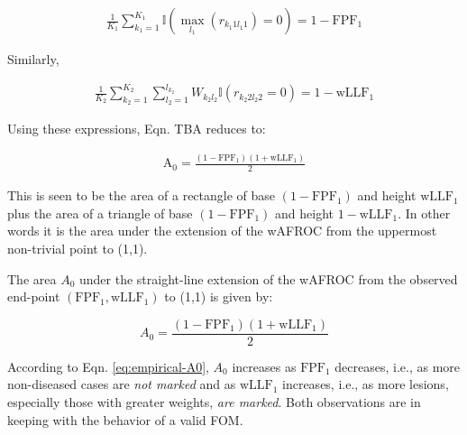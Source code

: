 \documentclass[
]{book}
\begin{document}
\begin{equation}
\begin{aligned}
\frac{1}{K_1}\sum_{k_1=1}^{K_1}\mathbb{I}\left ( \max_{l_1} \left (r_{k_1 1 l_1 1}  \right ) = 0  \right ) = 1 - \text{FPF}_1
\end{aligned}
\label{eq:empirical-theorem10}
\end{equation}

Similarly,

\begin{equation}
\begin{aligned}
\frac{1}{K_2}\sum_{k_2=1}^{K_2} \sum_{l_2=1}^{l_{k_2}} W_{k_2l_2} \mathbb{I}\left ( r_{k_2 2 l_2 2}  = 0  \right ) = 1 - \text{wLLF}_1
\end{aligned}
\label{eq:empirical-theorem11}
\end{equation}

Using these expressions, Eqn. TBA reduces to:

\begin{equation}
\begin{aligned}
\text{A}_0 = \frac{\left ( 1-\text{FPF}_1 \right ) \left ( 1+\text{wLLF}_1 \right )}{2}
\end{aligned}
\label{eq:empirical-theorem12}
\end{equation}

This is seen to be the area of a rectangle of base \(\left ( 1-\text{FPF}_1 \right )\) and height \(\text{wLLF}_1\) plus the area of a triangle of base \(\left ( 1-\text{FPF}_1 \right )\) and height \(1-\text{wLLF}_1\). In other words it is the area under the extension of the wAFROC from the uppermost non-trivial point to (1,1).

The area \(A_0\) under the straight-line extension of the wAFROC from the observed end-point \(\left ( \text{FPF}_1, \text{wLLF}_1 \right )\) to (1,1) is given by:

\begin{equation}
A_0 = \frac{\left ( 1 - \text{FPF}_1 \right )\left ( 1 + \text{wLLF}_1 \right )}{2}
\label{eq:empirical-A0}
\end{equation}

According to Eqn. \eqref{eq:empirical-A0}, \(A_0\) increases as \(\text{FPF}_1\) decreases, i.e., as more non-diseased cases are \emph{not marked} and as \(\text{wLLF}_1\) increases, i.e., as more lesions, especially those with greater weights, \emph{are marked}. Both observations are in keeping with the behavior of a valid FOM.
\end{document}
